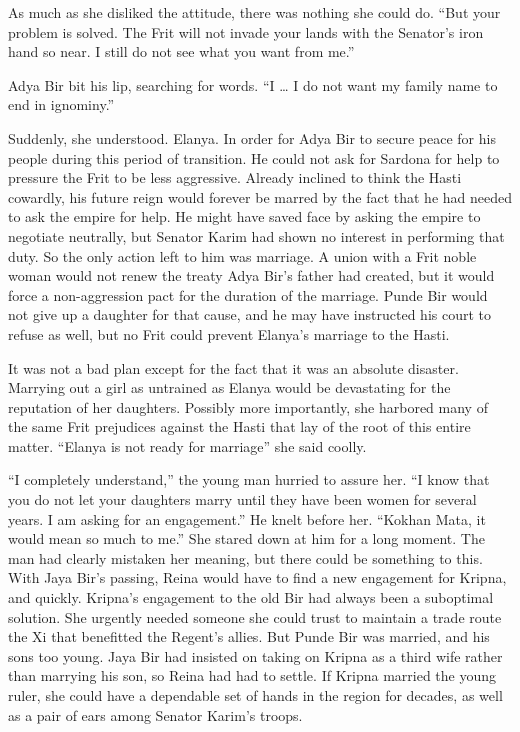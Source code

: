 \documentclass{article}
\begin{document}
	As much as she disliked the attitude, there was nothing she could do. “But your problem is solved. The Frit will not invade your lands with the Senator’s iron hand so near. I still do not see what you want from me.”
	
	Adya Bir bit his lip, searching for words. “I … I do not want my family name to end in ignominy.”
	
	Suddenly, she understood. Elanya. In order for Adya Bir to secure peace for his people during this period of transition. He could not ask for Sardona for help to pressure the Frit to be less aggressive. Already inclined to think the Hasti cowardly, his future reign would forever be marred by the fact that he had needed to ask the empire for help. He might have saved face by asking the empire to negotiate neutrally, but Senator Karim had shown no interest in performing that duty. So the only action left to him was marriage. A union with a Frit noble woman would not renew the treaty Adya Bir’s father had created, but it would force a non-aggression pact for the duration of the marriage. Punde Bir would not give up a daughter for that cause, and he may have instructed his court to refuse as well, but no Frit could prevent Elanya’s marriage to the Hasti. 
	
	It was not a bad plan except for the fact that it was an absolute disaster. Marrying out a girl as untrained as Elanya would be devastating for the reputation of her daughters. Possibly more importantly, she harbored many of the same Frit prejudices against the Hasti that lay of the root of this entire matter. “Elanya is not ready for marriage” she said coolly.
	
	“I completely understand,” the young man hurried to assure her. “I know that you do not let your daughters marry until they have been women for several years. I am asking for an engagement.” He knelt before her. “Kokhan Mata, it would mean so much to me.”
	She stared down at him for a long moment. The man had clearly mistaken her meaning, but there could be something to this. With Jaya Bir’s passing, Reina would have to find a new engagement for Kripna, and quickly. Kripna’s engagement to the old Bir had always been a suboptimal solution. She urgently needed someone she could trust to maintain a trade route the Xi that benefitted the Regent’s allies. But Punde Bir was married, and his sons too young. Jaya Bir had insisted on taking on Kripna as a third wife rather than marrying his son, so Reina had had to settle. If Kripna married the young ruler, she could have a dependable set of hands in the region for decades, as well as a pair of ears among Senator Karim’s troops.
	
\end{document}
